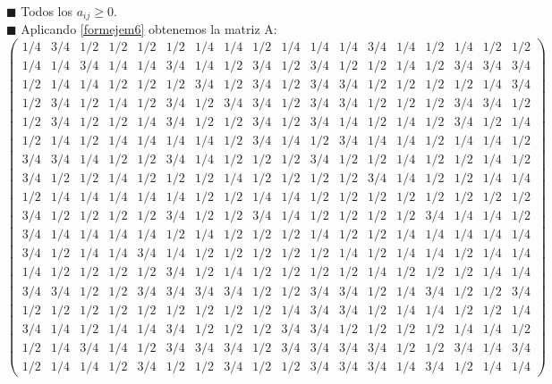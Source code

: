 	
	$\blacksquare $ Todos los $a_{ij} \geqslant 0$.\\
	
	$\blacksquare $ Aplicando \ref{formejem6} obtenemos la matriz A:\\
{\tiny 	\[
	\left(\begin{array}{cccccccccccccccccc}
	 1/4 & 3/4 & 1/2 & 1/2 & 1/2 & 1/2 & 1/4 & 1/4 & 1/2 & 1/4 & 1/4 & 1/4 & 3/4 & 1/4 & 1/2 & 1/4 & 1/2 & 1/2 \\
	 1/4 & 1/4 & 3/4 & 1/4 & 1/4 & 3/4 & 1/4 & 1/2 & 3/4 & 1/2 & 3/4 & 1/2 & 1/2 & 1/4 & 1/2 & 3/4 & 3/4 & 3/4 \\
	 1/2 & 1/4 & 1/4 & 1/2 & 1/2 & 1/2 & 3/4 & 1/2 & 3/4 & 1/2 & 3/4 & 3/4 & 1/2 & 1/2 & 1/2 & 1/2 & 1/4 & 3/4 \\
	 1/2 & 3/4 & 1/2 & 1/4 & 1/2 & 3/4 & 1/2 & 3/4 & 3/4 & 1/2 & 3/4 & 3/4 & 1/2 & 1/2 & 1/2 & 3/4 & 3/4 & 1/2 \\
	 1/2 & 3/4 & 1/2 & 1/2 & 1/4 & 3/4 & 1/2 & 1/2 & 3/4 & 1/2 & 3/4 & 1/4 & 1/2 & 1/4 & 1/2 & 3/4 & 1/2 & 1/4 \\
	 1/2 & 1/4 & 1/2 & 1/4 & 1/4 & 1/4 & 1/4 & 1/2 & 3/4 & 1/4 & 1/2 & 3/4 & 1/4 & 1/4 & 1/2 & 1/4 & 1/4 & 1/2 \\
	 3/4 & 3/4 & 1/4 & 1/2 & 1/2 & 3/4 & 1/4 & 1/2 & 1/2 & 1/2 & 3/4 & 1/2 & 1/2 & 1/4 & 1/2 & 1/2 & 1/4 & 1/2 \\
	 3/4 & 1/2 & 1/2 & 1/4 & 1/2 & 1/2 & 1/2 & 1/4 & 1/2 & 1/2 & 1/2 & 1/2 & 3/4 & 1/4 & 1/2 & 1/2 & 1/4 & 1/4 \\
	 1/2 & 1/4 & 1/4 & 1/4 & 1/4 & 1/4 & 1/2 & 1/2 & 1/4 & 1/4 & 1/2 & 1/2 & 1/2 & 1/2 & 1/2 & 1/2 & 1/2 & 1/2 \\
	 3/4 & 1/2 & 1/2 & 1/2 & 1/2 & 3/4 & 1/2 & 1/2 & 3/4 & 1/4 & 1/2 & 1/2 & 1/2 & 1/2 & 3/4 & 1/4 & 1/4 & 1/2 \\
	 3/4 & 1/4 & 1/4 & 1/4 & 1/4 & 1/2 & 1/4 & 1/2 & 1/2 & 1/2 & 1/4 & 1/2 & 1/2 & 1/4 & 1/4 & 1/4 & 1/4 & 1/4 \\
	 3/4 & 1/2 & 1/4 & 1/4 & 3/4 & 1/4 & 1/2 & 1/2 & 1/2 & 1/2 & 1/2 & 1/4 & 1/2 & 1/4 & 1/4 & 1/2 & 1/4 & 1/4 \\
	 1/4 & 1/2 & 1/2 & 1/2 & 1/2 & 3/4 & 1/2 & 1/4 & 1/2 & 1/2 & 1/2 & 1/2 & 1/4 & 1/2 & 1/2 & 1/2 & 1/4 & 1/4 \\
	 3/4 & 3/4 & 1/2 & 1/2 & 3/4 & 3/4 & 3/4 & 3/4 & 1/2 & 1/2 & 3/4 & 3/4 & 1/2 & 1/4 & 3/4 & 1/2 & 1/2 & 3/4 \\
	 1/2 & 1/2 & 1/2 & 1/2 & 1/2 & 1/2 & 1/2 & 1/2 & 1/2 & 1/4 & 3/4 & 3/4 & 1/2 & 1/4 & 1/4 & 1/2 & 1/2 & 1/4 \\
	 3/4 & 1/4 & 1/2 & 1/4 & 1/4 & 3/4 & 1/2 & 1/2 & 1/2 & 3/4 & 3/4 & 1/2 & 1/2 & 1/2 & 1/2 & 1/4 & 1/4 & 1/2 \\
	 1/2 & 1/4 & 3/4 & 1/4 & 1/2 & 3/4 & 3/4 & 3/4 & 1/2 & 3/4 & 3/4 & 3/4 & 3/4 & 1/2 & 1/2 & 3/4 & 1/4 & 3/4 \\
	 1/2 & 1/4 & 1/4 & 1/2 & 3/4 & 1/2 & 1/2 & 3/4 & 1/2 & 1/2 & 3/4 & 3/4 & 3/4 & 1/4 & 3/4 & 1/2 & 1/4 & 1/4 	
	 \end{array} \right) 
	\]}
	
